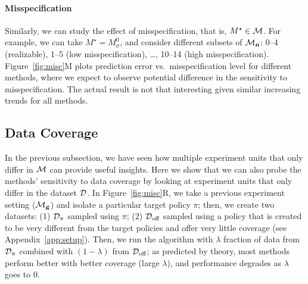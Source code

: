 \paragraph{Misspecification} Similarly, we can study the effect of misspecification, that is, $M^\star \in \mathcal{M}$. For example, we can take $M^\star = M_{\sigma}^0$, and consider different subsets of $\mathcal{M}_{\mathbf{n}}$: 0--4 (realizable), 1--5 (low misspecification), \ldots, 10--14 (high misspecification). Figure~\ref{fig:misc}M plots prediction error vs.~misspecification level for different methods, where we expect to observe potential difference in the sensitivity to misspecification. The actual result is not that interesting given  similar increasing trends for all methods. 

%



\subsection{Data Coverage} \label{sec:exp-coverage}
In the previous subsection, we have seen how multiple experiment units that only differ in $\mathcal{M}$ can provide useful insights. Here we show that we can also probe the methods' sensitivity to data coverage by looking at experiment units that only differ in the dataset $\mathcal{D}$. In Figure~\ref{fig:misc}R, we take a previous experiment setting ($\mathcal{M}_{\mathbf{g}}$) and isolate a particular target policy $\pi$; then, we create two datasets: (1) $\mathcal{D}_\pi$ sampled using $\pi$; (2) $\mathcal{D}_{\textrm{off}}$ sampled using a policy that is created to be very different from the target policies and offer very little coverage (see Appendix~\ref{app:setup}). Then, we run the algorithm with $\lambda$ fraction of data from $\mathcal{D}_\pi$ combined with $(1-\lambda)$ from $\mathcal{D}_{\textrm{off}}$; as predicted by theory, most methods perform better with better coverage (large $\lambda$), and performance degrades as $\lambda$ goes to $0$. %


%